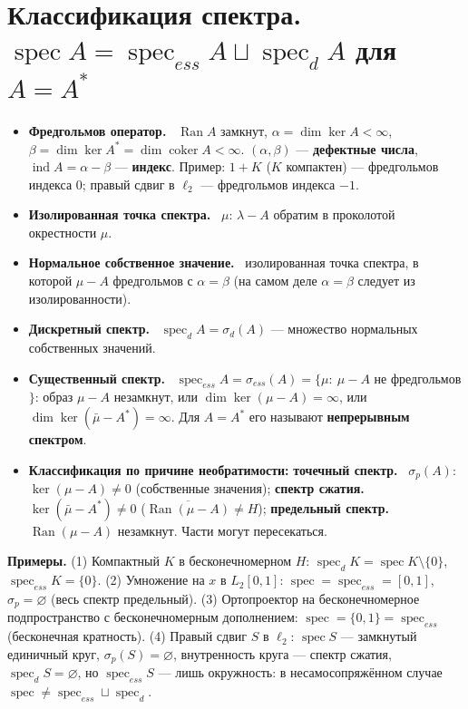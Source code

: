 \documentclass[11pt,a4paper]{article}
\newcommand{\spec}{\operatorname{spec}}
\newcommand{\Ran}{\operatorname{Ran}}
\newcommand{\ind}{\operatorname{ind}}
\newcommand{\df}[1]{\textbf{#1.}~}
\begin{document}
\section{Классификация спектра. $\spec A=\spec_{ess}A\sqcup\spec_dA$ для $A=A^*$}
\begin{defs}
\begin{itemize}
\item \df{Фредгольмов оператор} $\Ran A$ замкнут, $\alpha=\dim\ker A<\infty$, $\beta=\dim\ker A^*=\dim\operatorname{coker}A<\infty$. $(\alpha,\beta)$ — \textbf{дефектные числа}, $\ind A=\alpha-\beta$ — \textbf{индекс}. Пример: $1+K$ ($K$ компактен) — фредгольмов индекса $0$; правый сдвиг в $\ell_2$ — фредгольмов индекса $-1$.
\item \df{Изолированная точка спектра} $\mu$: $\lambda-A$ обратим в проколотой окрестности $\mu$.
\item \df{Нормальное собственное значение} изолированная точка спектра, в которой $\mu-A$ фредгольмов с $\alpha=\beta$ (на самом деле $\alpha=\beta$ следует из изолированности).
\item \df{Дискретный спектр} $\spec_dA=\sigma_d(A)$ — множество нормальных собственных значений.
\item \df{Существенный спектр} $\spec_{ess}A=\sigma_{ess}(A)=\{\mu:\ \mu-A$ не фредгольмов$\}$: образ $\mu-A$ незамкнут, или $\dim\ker(\mu-A)=\infty$, или $\dim\ker(\bar\mu-A^*)=\infty$. Для $A=A^*$ его называют \textbf{непрерывным спектром}.
\item \textbf{Классификация по причине необратимости:} \df{точечный спектр} $\sigma_p(A)$: $\ker(\mu-A)\ne0$ (собственные значения); \df{спектр сжатия} $\ker(\bar\mu-A^*)\ne0$ ($\overline{\Ran(\mu-A)}\ne H$); \df{предельный спектр} $\Ran(\mu-A)$ незамкнут. Части могут пересекаться.
\end{itemize}
\textbf{Примеры.} (1) Компактный $K$ в бесконечномерном $H$: $\spec_dK=\spec K\setminus\{0\}$, $\spec_{ess}K=\{0\}$. (2) Умножение на $x$ в $L_2[0,1]$: $\spec=\spec_{ess}=[0,1]$, $\sigma_p=\varnothing$ (весь спектр предельный). (3) Ортопроектор на бесконечномерное подпространство с бесконечномерным дополнением: $\spec=\{0,1\}=\spec_{ess}$ (бесконечная кратность). (4) Правый сдвиг $S$ в $\ell_2$: $\spec S$ — замкнутый единичный круг, $\sigma_p(S)=\varnothing$, внутренность круга — спектр сжатия, $\spec_dS=\varnothing$, но $\spec_{ess}S$ — лишь окружность: в несамосопряжённом случае $\spec\ne\spec_{ess}\sqcup\spec_d$.
\end{defs}
\end{document}
